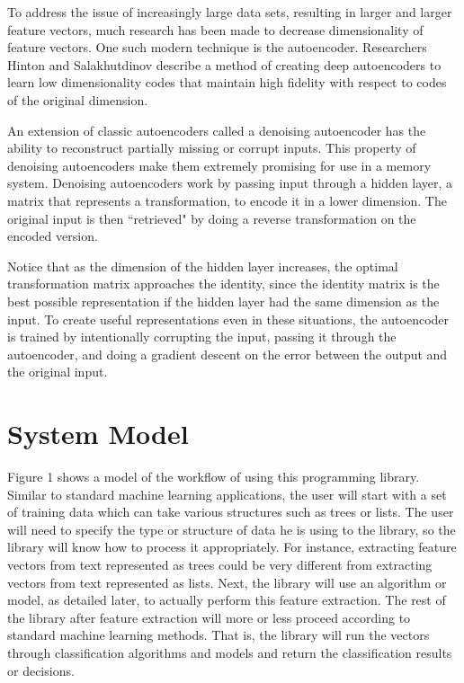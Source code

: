 \documentclass{sig-alternate}
\begin{document}
To address the issue of increasingly large data sets, resulting in larger and larger feature vectors,
much research has been made to decrease dimensionality of feature vectors. One such modern technique
is the autoencoder. Researchers Hinton and Salakhutdinov %
describe a method of creating deep autoencoders to learn low dimensionality codes that maintain
high fidelity with respect to codes of the original dimension.

An extension of classic autoencoders called a denoising autoencoder has the ability to reconstruct partially missing or
corrupt inputs. This property of denoising autoencoders make them extremely promising for use
in a memory system. Denoising autoencoders work by passing input through a hidden layer, a matrix
that represents a transformation, to encode it in a lower dimension. The original input is then
``retrieved" by doing a reverse transformation on the encoded version. 


Notice that as the dimension
of the hidden layer increases, the optimal transformation matrix approaches the identity, since
the identity matrix is the best possible representation if the hidden layer had the same dimension
as the input. To create useful representations even in these situations, the autoencoder is trained
by intentionally corrupting the input, passing it through the autoencoder, and doing a gradient
descent on the error between the output and the original input.

\section{System Model}
\label{sec:sysmodel}

Figure 1 shows a model of the workflow of using this programming library. Similar to standard 
machine learning applications, the user will start with a set of training data which can take 
various structures such as trees or lists. The user will need to specify the type or structure
of data he is using to the library, so the library will know how to process it appropriately. 
For instance, extracting feature vectors from text represented as trees could be very different
from extracting vectors from text represented as lists. Next, the library will use an algorithm
or model, as detailed later, to actually perform this feature extraction. The rest of the library 
after feature extraction will more or less proceed according to standard machine learning methods.
That is, the library will run the vectors through classification algorithms and models 
and return the classification results or decisions.
\end{document}
